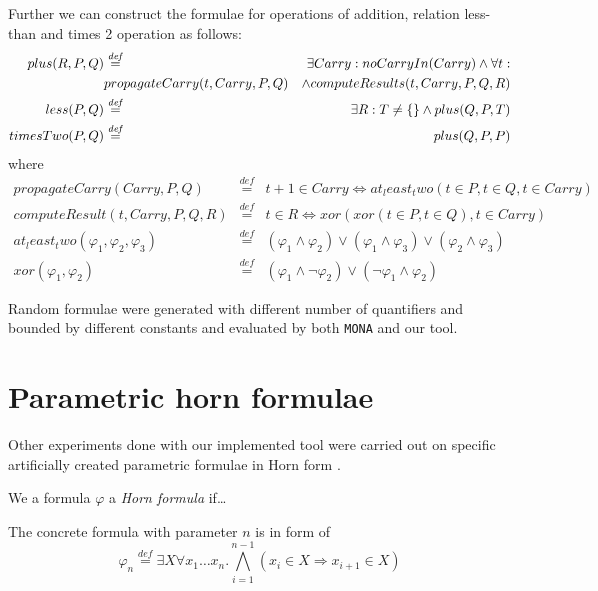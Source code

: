 Further we can construct the formulae for operations of addition, relation
less-than and times 2 operation as follows:
\begin{eqnarray}
 plus(R, P, Q) & \overset{\mathit{def}}{=} & \exists Carry:
 noCarryIn(Carry) \wedge \forall t:\\
 &  propagateCarry(t, Carry, P, Q) & \wedge computeResults(t,
 Carry, P, Q, R)\\
 less(P, Q) & \overset{\mathit{def}}{=} &\exists R: T \neq \{\empty\} \wedge
 plus(Q, P, T)\\
 timesTwo(P, Q) & \overset{\mathit{def}}{=} & plus(Q, P, P) 
\end{eqnarray}
where
\begin{eqnarray}
 propagateCarry(Carry, P, Q) & \overset{\mathit{def}}{=} & t + 1 \in Carry
 \Leftrightarrow at_least_two(t \in P, t \in Q, t \in Carry)\\
 computeResult(t, Carry, P, Q, R) & \overset{\mathit{def}}{=} & t \in R
 \Leftrightarrow xor(xor(t \in P, t \in Q), t \in Carry)\\
 at_least_two(\varphi_1, \varphi_2, \varphi_3) & \overset{\mathit{def}}{=} &
 (\varphi_1 \wedge \varphi_2) \vee (\varphi_1 \wedge \varphi_3) \vee (\varphi_2
 \wedge \varphi_3)\\
 xor(\varphi_1, \varphi_2) & \overset{\mathit{def}}{=} & (\varphi_1 \wedge
 \neg\varphi_2) \vee (\neg\varphi_1 \wedge \varphi_2)
\end{eqnarray}

Random formulae were generated with different number of quantifiers and bounded
by different constants and evaluated by both \texttt{MONA} and our tool. 

\section{Parametric horn formulae}

Other experiments done with our implemented tool were carried out on specific
artificially created parametric formulae in Horn form \cite{horn}. 

\begin{defz}
We a formula $\varphi$ a \emph{Horn formula} if\ldots
\end{defz}

The concrete formula with parameter $n$ is in form of
\begin{equation}
 \varphi_n \overset{\mathit{def}}{=} \exists X\forall x_1\ldots x_n.
 \bigwedge_{i = 1}^{n-1} (x_i \in X \Rightarrow x_{i+1} \in X)
\end{equation}

